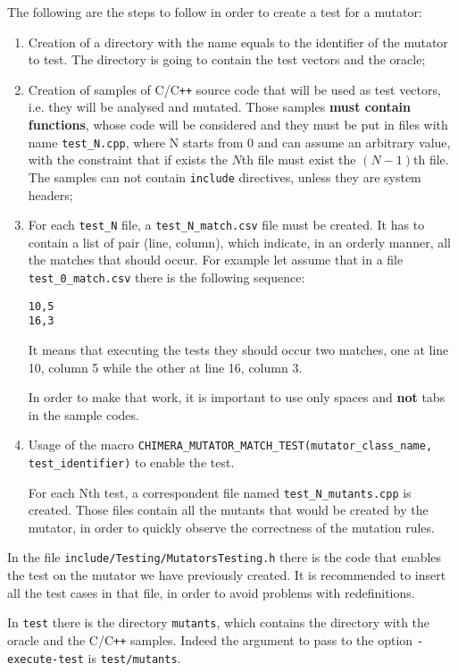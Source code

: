 \documentclass[10pt,a4paper]{article}
\begin{document}
The following are the steps to follow in order to create a test for a mutator:
\begin{enumerate}
\item Creation of a directory with the name equals to the identifier of the mutator to test. The directory is going to contain the test vectors and the oracle;

\item Creation of samples of C/C\texttt{++} source code that will be used as test vectors, i.e. they will be analysed and mutated. Those samples \textbf{must contain functions}, whose code will be considered and they must be put in files with name \texttt{test\_N.cpp}, where N starts from 0 and can assume an arbitrary value, with the constraint that if exists the $N$th file must exist the $(N-1)$th file. The samples can not contain \texttt{include} directives, unless they are system headers;

\item For each \texttt{test\_N} file, a \texttt{test\_N\_match.csv} file must be created. It has to contain a list of pair (line, column), which indicate, in an orderly manner, all the matches that should occur. For example let assume that in a file \texttt{test\_0\_match.csv} there is the following sequence:
\begin{verbatim}
10,5
16,3
\end{verbatim}
It means that executing the tests they should occur two matches, one at line 10, column 5 while the other at line 16, column 3.

In order to make that work, it is important to use only spaces and \textbf{not} tabs in the sample codes.

\item Usage of the macro \texttt{CHIMERA\_MUTATOR\_MATCH\_TEST(mutator\_class\_name, test\_identifier)} to enable the test.

For each Nth test, a correspondent file named \texttt{test\_N\_mutants.cpp} is created. Those files contain all the mutants that would be created by the mutator, in order to quickly observe the correctness of the mutation rules.
\end{enumerate}

In the file \texttt{include/Testing/MutatorsTesting.h} there is the code that enables the test on the mutator we have previously created. It is recommended to insert all the test cases in that file, in order to avoid problems with redefinitions.

In \texttt{test} there is the directory \texttt{mutants}, which contains the directory with the oracle and the C/C\texttt{++} samples. Indeed the argument to pass to the option \texttt{-execute-test} is \texttt{test/mutants}.
\end{document}
